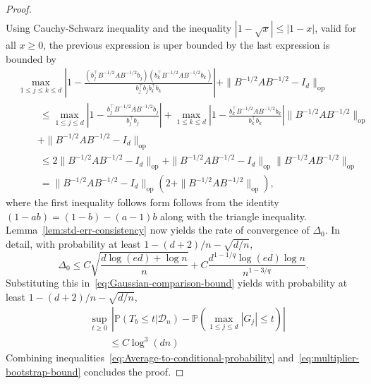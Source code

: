 \documentclass{article}
\begin{document}
\begin{appendices}
\begin{proof}
\begin{align*}
\end{align*}
Using Cauchy-Schwarz inequality and the inequality $|1 - \sqrt{x}| \le |1 - x|$, valid for all $x \geq 0$, the previous expression is uper bounded by
the last expression is bounded by
\begin{align*}
&
\max_{1\le j \le k\le d}\left|1 - \frac{(b_j^{\top}B^{-1/2}AB^{-1/2}b_j)(b_k^{\top}B^{-1/2}AB^{-1/2}b_k)}{b_j^{\top}b_jb_k^{\top}b_k}\right| + \|B^{-1/2}AB^{-1/2} - I_d\|_{\mathrm{op}}\\ &\qquad~ \le \max_{1\le j\le d}\left|1 - \frac{b_j^{\top}B^{-1/2}AB^{-1/2}b_j}{b_j^{\top}b_j}\right| + \max_{1\le k\le d}\left|1 - \frac{b_k^{\top}B^{-1/2}AB^{-1/2}b_k}{b_k^{\top}b_k}\right|\|B^{-1/2}AB^{-1/2}\|_{\mathrm{op}}\\ &\qquad+ \|B^{-1/2}AB^{-1/2} - I_d\|_{\mathrm{op}}\\ &\qquad~ \le 2\|B^{-1/2}AB^{-1/2} - I_d\|_{\mathrm{op}} + \|B^{-1/2}AB^{-1/2} - I_d\|_{\mathrm{op}}\|B^{-1/2}AB^{-1/2}\|_{\mathrm{op}}\\ &\qquad~ = \|B^{-1/2}AB^{-1/2} - I_d\|_{\mathrm{op}}\left(2 + \|B^{-1/2}AB^{-1/2}\|_{\mathrm{op}}\right),
\end{align*}
where the first inequality follows form follows from the identity $(1 - ab) = (1 - b) - (a-1)b$ along with the triangle inequality.
Lemma~\ref{lem:std-err-consistency} now yields the rate of convergence of $\Delta_0$. In detail,
with probability at least $1 - (d+2)/n - \sqrt{d/n}$,
\begin{equation}\label{eq:multiplier-bootstrap-bound-1}
\Delta_0 \le C\sqrt{\frac{d\log(ed) + \log n}{n}} + C\frac{d^{1-1/q}\log(ed)\log n}{n^{1-3/q}}.
\end{equation}
Substituting this in~\eqref{eq:Gaussian-comparison-bound} yields with probability at least $1 - (d + 2)/n - \sqrt{d/n}$,
\begin{equation}\label{eq:multiplier-bootstrap-bound}
\begin{split}
&\sup_{t\ge 0}\,\left|\mathbb{P}(T_b \le t\big|\mathcal{D}_n) - \mathbb{P}\left(\max_{1\le j\le d}|G_j| \le t\right)\right|\\ &\qquad\le C\log^3(dn)\left.
\end{split}
\end{equation}
Combining inequalities~\eqref{eq:Average-to-conditional-probability} and~\eqref{eq:multiplier-bootstrap-bound} concludes the proof.
\end{proof}
\end{appendices}


\end{document}
